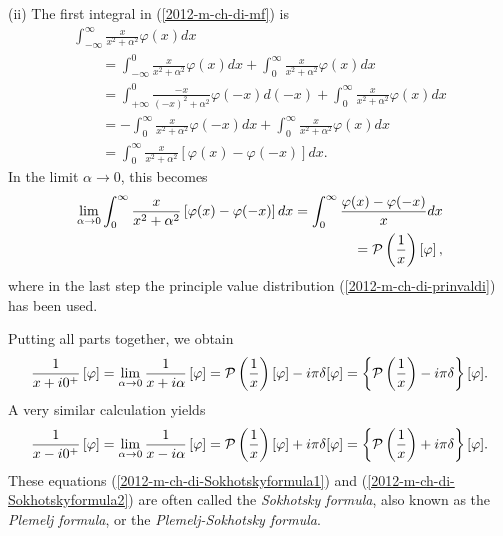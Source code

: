 (ii)
The first integral in (\ref{2012-m-ch-di-mf}) is
\begin{equation}
\begin{split}
\int_{-\infty}^\infty   \frac{x}{x^2+ \alpha^2}   \varphi(x) dx
\\
\qquad
=
\int_{-\infty}^0   \frac{x}{x^2+ \alpha^2}   \varphi(x) dx
+
\int_{0}^\infty   \frac{x}{x^2+ \alpha^2}   \varphi(x) dx
\\
\qquad
=
\int_{+\infty}^0   \frac{-x}{(-x)^2+ \alpha^2}   \varphi(-x) d(-x)
+
\int_{0}^\infty   \frac{x}{x^2+ \alpha^2}   \varphi(x) dx
\\
\qquad
=
-\int_{0}^\infty   \frac{ x}{x^2+ \alpha^2}   \varphi(-x) dx
+
\int_{0}^\infty   \frac{x}{x^2+ \alpha^2}   \varphi(x) dx
\\
\qquad
=
 \int_{0}^\infty   \frac{ x}{x^2+ \alpha^2} \left[  \varphi(x) - \varphi(-x) \right] dx
.
\end{split}
\end{equation}
In the limit $\alpha  \rightarrow 0$, this becomes
\begin{equation}
\begin{split}
\lim_{\alpha  \rightarrow 0} \int_{0}^\infty   \frac{ x}{x^2+ \alpha^2} \left[  \varphi(x) - \varphi(-x) \right] dx
=
\int_{0}^\infty   \frac{ \varphi(x) - \varphi(-x) }{x} dx
\\
\qquad =
{\cal P} \left(\frac{1}{x}\right) \left[\varphi\right]
,
\end{split}
\end{equation}
where in the last step the principle value distribution (\ref{2012-m-ch-di-prinvaldi})
has been used.

Putting all parts together, we obtain
\begin{equation}
\frac{1}{x+i0^+} \left[ \varphi \right]
= \lim_{\alpha  \rightarrow 0}\frac{1}{x+i\alpha} \left[ \varphi \right]
=  {\cal P} \left(\frac{1}{x}\right) \left[\varphi\right]
-i \pi \delta [\varphi ] = \left\{
{\cal P} \left(\frac{1}{x}\right) -i \pi \delta
\right\}  [\varphi ].
\label{2012-m-ch-di-Sokhotskyformula1}
\end{equation}
A very similar calculation yields
\begin{equation}
\frac{1}{x-i0^+} \left[ \varphi \right]
=
\lim_{\alpha  \rightarrow 0}\frac{1}{x-i\alpha} \left[ \varphi \right]
=  {\cal P} \left(\frac{1}{x}\right) \left[\varphi\right]
+i \pi \delta [\varphi ] = \left\{
{\cal P} \left(\frac{1}{x}\right) +i \pi \delta
\right\}  [\varphi ].
\label{2012-m-ch-di-Sokhotskyformula2}
\end{equation}
These equations
(\ref{2012-m-ch-di-Sokhotskyformula1})
and
(\ref{2012-m-ch-di-Sokhotskyformula2})
are often called the
{\em Sokhotsky  formula}, also known as the {\em Plemelj  formula}, or the {\em Plemelj-Sokhotsky formula}.




